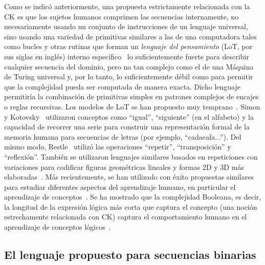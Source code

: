Como se indicó anteriormente, una propuesta estrictamente relacionada con la CK es que los sujetos humanos comprimen las secuencias internamente, no necesariamente usando un conjunto de instrucciones de un lenguaje universal, sino usando una variedad de primitivas similares a las de una computadora tales como bucles y otras rutinas que forman un \textit{lenguaje del pensamiento} (LoT, por sus siglas en inglés)  interno específico~\cite{fodor1975language} lo suficientemente fuerte para describir cualquier secuencia del dominio, pero no tan complejo como el de una Máquina de Turing universal y, por lo tanto, lo suficientemente débil como para permitir que la complejidad pueda ser computada de manera exacta. Dicho lenguaje permitiría la combinación de primitivas simples en patrones complejos de encajes o reglas recursivas. Los modelos de LoT se han propuesto muy temprano~\cite{f33}. Simon y Kotovsky~\cite{f48} utilizaron conceptos como ``igual'', ``siguiente'' (en el alfabeto) y la capacidad de recorrer una serie para construir una representación formal de la memoria humana para secuencias de letras (por ejemplo, ``cadaeafa...''). Del mismo modo, Restle~\cite{f37} utilizó las operaciones ``repetir'', ``transposición'' y ``reflexión''. También se utilizaron lenguajes similares basados en repeticiones con variaciones para codificar figuras geométricas lineales y formas 2D y 3D más elaboradas~\cite{f33,leeuwenberg1971perceptual}. Más recientemente, se han utilizado con éxito propuestas similares para estudiar diferentes aspectos del aprendizaje humano, en particular el aprendizaje de conceptos~\cite{feldman2000minimization,f51, piantadosi2012bootstrapping,piantadosi2016four,f54}.  Se ha mostrado que la complejidad Booleana, es decir, la longitud de la expresión lógica más corta que captura el concepto (una noción estrechamente relacionada con CK) captura el comportamiento humano en el aprendizaje de conceptos lógicos~\cite{feldman2000minimization,feldman2003simplicity}.

\subsection{El lenguaje propuesto para secuencias binarias}

